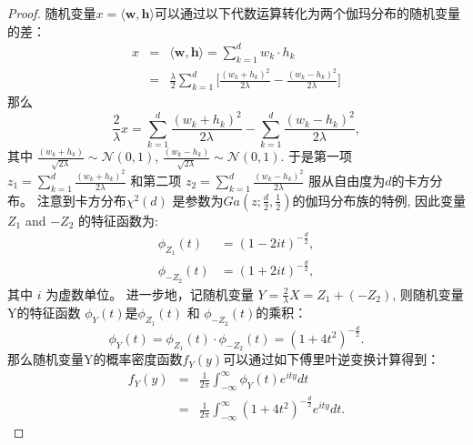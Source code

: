 \begin{proof}
随机变量$x=\langle \mathbf{w}, \mathbf{h} \rangle$可以通过以下代数运算转化为两个伽玛分布的随机变量的差：
\begin{eqnarray}
	x &=& \langle {\mathbf{w}},{\mathbf{h}} \rangle = \sum\nolimits_{k = 1}^d {w_k} \cdot {h_{k}} \nonumber\\
	&=& \frac{{{\lambda }}}{2}\sum\nolimits_{k = 1}^d {[\frac{{{{({w_{k}} + {h_{k}})}^2}}}{{2{\lambda  }}} - } \frac{{{{({w_{k}} - {h_{k}})}^2}}}{{2{\lambda  }}}]
\end{eqnarray}
那么
\begin{equation}
	\frac{2}{{{\lambda  }}}x = \sum_{k = 1}^{d} \frac{{{{({w_{k}} + {h_{k}})}^2}}}{{2{\lambda }}} - \sum_{k = 1}^{d} \frac{{{{({w_{k}} - {h_{k}})}^2}}}{{2{\lambda  }}},
\end{equation}
其中 $\frac{(w_k + h_k)}{\sqrt {2{\lambda}}} \sim \mathcal{N}(0,1)$, $\frac{(w_k - h_k)}{\sqrt {2{\lambda}}} \sim \mathcal{N}(0,1)$. 于是第一项${z_1} = \sum\nolimits_{k = 1}^d {\frac{{{{({w_{k}} + {h_{k}})}^2}}}{{2{\lambda }}}} $ 和第二项 ${z_2} = \sum\nolimits_{k = 1}^d {\frac{{{{({w_{k}} - {h_{k}})}^2}}}{{2{\lambda }}}} $ 服从自由度为$d$的卡方分布。 注意到卡方分布${\chi ^2}(d)$ 是参数为$Ga(z;\frac{d}{2},\frac{1}{2})$的伽玛分布族的特例, 因此变量${Z_1}$ and $ - {Z_2}$ 的特征函数为:
\begin{align}
	{\phi _{{Z_1}}}(t) &= {(1 - 2it)^{ - \frac{d}{2}}}, \\
	{\phi _{ - {Z_2}}}(t) &= {(1 + 2it)^{ - \frac{d}{2}}},
\end{align}
其中 $i$ 为虚数单位。 进一步地，记随机变量 $Y = \frac{2}{{{\lambda }}}X  = {Z_1} + ( - {Z_2})$, 则随机变量Y的特征函数 ${\phi _Y}(t)$是${\phi _{{Z_1}}}(t)$ 和 ${\phi _{ - {Z_2}}}(t)$的乘积：
\begin{equation}
	{\phi _Y}(t) = {\phi _{{Z_1}}}(t) \cdot {\phi _{ - {Z_2}}}(t) = {(1 + 4{t^2})^{ - \frac{d}{2}}}.
\end{equation}
那么随机变量Y的概率密度函数${f_Y}(y)$可以通过如下傅里叶逆变换计算得到：
\begin{eqnarray}
		{f_Y}(y) &=& \frac{1}{{2\pi }}\int_{ - \infty }^\infty  {{\phi _Y}(t){e^{ity}}dt} \nonumber\\
		& =& \frac{1}{{2\pi }}\int_{ - \infty }^\infty  {{{(1 + 4{t^2})}^{ - \frac{d}{2}}}{e^{ity}}dt}.
\end{eqnarray}


\end{proof}
